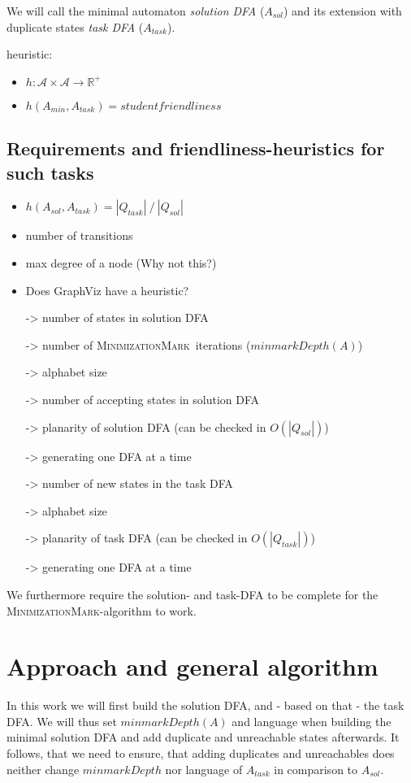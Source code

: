 \documentclass[a4paper, oneside, 11pt]{report}
\theoremstyle{definition}
\theoremstyle{remark}
\newcommand{\MinMark}{\textsc{MinimizationMark}}
\begin{document}
We will call the minimal automaton \emph{solution DFA} ($A_{sol}$) and its extension with duplicate states \emph{task DFA} ($A_{task}$).

heuristic:
\begin{itemize}
	\item $h \colon \mathcal{A} \times \mathcal{A} \to \mathbb{R^+}$
	\item $h(A_{min}, A_{task}) = studentfriendliness$
\end{itemize}

\subsection{Requirements and friendliness-heuristics for such tasks}

\begin{itemize}
	\item $h(A_{sol}, A_{task}) = |Q_{task}|\ /\ |Q_{sol}|$
	\item number of transitions
	\item max degree of a node (Why not this?)
	\item Does GraphViz have a heuristic?
	
	\item[->] number of states in solution DFA
	\item[->] number of \MinMark\ iterations ($minmarkDepth(A)$)
	\item[->] alphabet size
	\item[->] number of accepting states in solution DFA
	\item[->] planarity of solution DFA (can be checked in $O(|Q_{sol}|)$)
	\item[->] generating one DFA at a time
	
	\item[->] number of new states in the task DFA
	\item[->] alphabet size
	\item[->] planarity of task DFA (can be checked in $O(|Q_{task}|)$)
	\item[->] generating one DFA at a time
\end{itemize}
We furthermore require the solution- and task-DFA to be complete for the \MinMark-algorithm to work.

\section{Approach and general algorithm}

In this work we will first build the solution DFA, and - based on that - the task DFA. We will thus set $minmarkDepth(A)$ and language when building the minimal solution DFA and add duplicate and unreachable states afterwards. It follows, that we need to ensure, that adding duplicates and unreachables does neither change $minmarkDepth$ nor language of $A_{task}$ in comparison to $A_{sol}$.
\end{document}
